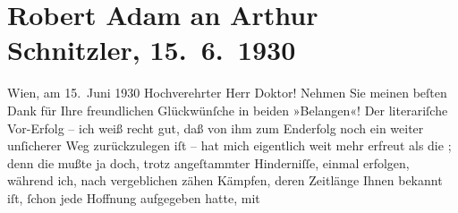 

         \renewcommand{\erwaehnteInstitutionen}{Institutionen: Drei Masken-Verlag, Handelsgericht Wien}
         \renewcommand{\erwaehnteOrte}{Orte: Berlin, Wien}
         \renewcommand{\erwaehnteWerke}{Werke: Margot und das Jugendgericht}
               \section[Robert Adam an Arthur Schnitzler, 15. 6. 1930]{ Robert Adam an Arthur Schnitzler, 15. 6. 1930}\nopagebreak{}\rehead{ }\begin{ledgroupsized}[t]{13cm}\normalsize\beginnumbering \toendnotes[C]{\smallbreak\pagebreak[2]} 
\toendnotes[C]{\smallbreak}\pstart
           \raggedleft{}{\pb}Wien, am 15. Juni 1930\pend
           \pstart{}Hochverehrter Herr Doktor!\pend\pstart
           Nehmen Sie meinen beſten Dank für Ihre freundlichen Glückwünſche in beiden
               »Belangen«!\pend
           \pstart
           Der literariſche Vor-Erfolg – ich weiß recht gut, daß von ihm zum Enderfolg noch ein
               weiter unſicherer Weg zurückzulegen iſt – hat mich eigentlich weit mehr erfreut als
               die \label{K_L02538-1v}\label{K_L02538-1h}; denn die mußte ja doch, trotz
               angeſtammter Hinderniſſe, einmal erfolgen, während ich, nach vergeblichen zähen
               Kämpfen, deren Zeitlänge Ihnen bekannt iſt, ſchon jede Hoffnung aufgegeben hatte, mit

\end{ledgroupsized}
